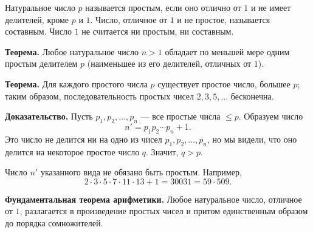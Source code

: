 \begin{rusblock}
Натуральное число $p$ называется простым, если оно отлично от $1$ и не имеет делителей, кроме $p$ и $1$. Число, отличное от $1$ и не простое, называется составным. Число $1$ не считается ни простым, ни составным.

\textbf{Теорема.} Любое натуральное число $n>1$ обладает по меньшей мере одним простым делителем $p$ (наименьшее из его делителей, отличных от $1$).

\textbf{Теорема.} Для каждого простого числа $p$ существует простое число, большее $p$; таким образом, последовательность простых чисел $2,3,5,\ldots$ бесконечна.

\textbf{Доказательство.} Пусть $p_1,p_2,\ldots,p_n$ --- все простые числа $\le p$. Образуем число
\[
n'=p_1p_2\cdots p_n+1.
\]
Это число не делится ни на одно из чисел $p_1,p_2,\ldots,p_n$, но мы видели, что оно делится на некоторое простое число $q$. Значит, $q>p$.

Число $n'$ указанного вида не обязано быть простым. Например,
\[
2\cdot3\cdot5\cdot7\cdot11\cdot13+1=30031=59\cdot509.
\]

\textbf{Фундаментальная теорема арифметики.} Любое натуральное число, отличное от $1$, разлагается в произведение простых чисел и притом единственным образом до порядка сомножителей.
\end{rusblock}

